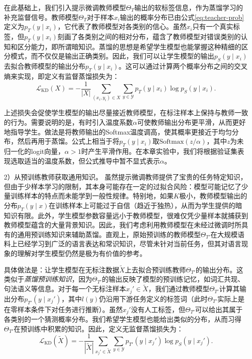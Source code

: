 \documentclass[../main.tex]{subfiles}
\begin{document}
在此基础上，我们引入提示微调教师模型$\Theta_T$输出的软标签信息，作为蒸馏学习的补充监督信号。教师模型$\Theta_T$对于样本$x_i$输出的概率分布已由公式\eqref{eq:teacher-prob}定义为$p_T(y\mid x_i)$，它代表了教师模型对各类别的信心。虽然$x_i$只有一个真实标签，但$p_T(y\mid x_i)$刻画了各类别之间的相对分布，蕴含了教师模型对错误类别的认知和区分能力，即所谓暗知识。蒸馏的思想是希望学生模型也能掌握这种精细的区分模式，而不仅仅是输出正确类别。因此，我们可以让学生模型的输出$p_S(y\mid x_i)$去拟合教师模型的输出分布$p_T(y\mid x_i)$。这可以通过计算两个概率分布之间的交叉熵来实现，即定义有监督蒸馏损失为：
\begin{equation}
	\label{eq:kd-loss-supervised}
	\mathcal{L}_{\text{KD}}(X) = -\frac{1}{|X|}\sum_{(x_i, y_i)\in X} \sum_{y \in \mathcal{Y}} p_T(y \mid x_i) \log p_S(y \mid x_i) .
\end{equation}

上述损失会促使学生模型的输出尽量接近教师模型，在标注样本上保持与教师一致的行为。需要说明的是，有时引入温度系数$\alpha$可使教师输出分布更平滑，从而更好地指导学生。做法是将教师输出的Softmax温度调高，使其概率更接近于均匀分布，然后再用于蒸馏。公式上相当于将$p_T(y\mid x_i)$取$\text{Softmax}(z/\alpha)$，其中$z$为未归一化的logit向量，$\alpha > 1$时产生平滑作用。在本章实验中，我们将根据验证集表现选取适当的温度系数，但公式推导中暂不显式表示$\alpha$。

2）从预训练教师获取通用知识。 虽然提示微调教师提供了宝贵的任务特定知识，但由于少样本学习的限制，其本身可能存在一定的过拟合风险：模型可能记忆了少量训练样本的特点而未能学到一般性规律。特别地，如果$K$极小，教师模型输出的分布$p_T(y\mid x)$在训练样本上可能过于自信（趋近于独热），从而为学生提供的暗知识有限。此外，学生模型参数容量远小于教师模型，很难仅凭少量样本就捕获到教师模型蕴含的大量背景知识。因此，我们考虑利用教师模型在未经过微调时所具有的通用预训练知识来辅助蒸馏。直观上，原始预训练的教师模型$\Theta_{T'}$在大规模语料上已经学习到广泛的语言表达和常识知识，尽管未针对当前任务，但其对语言现象的理解对学生模型仍然是极为有价值的参考。

具体做法是：让学生模型在无标注数据$\tilde{X}$上去拟合预训练教师$\Theta_{T'}$的输出分布。这类似于\emph{蒸馏预训练知识}，因为$\Theta_{T'}$的输出反映了模型的预训练记忆，如词汇共现、句法语义等信息。对于每一个无标注样本$x_j' \in \tilde{X}$，我们通过教师模型$\Theta_{T'}$计算其输出分布$p_{T'}(y\mid x_j')$，其中$l(y)$仍沿用下游任务定义的标签词（此时$\Theta_{T'}$实际上是在零样本条件下对任务进行推断）。虽然$x_j'$没有人工标签，但$\Theta_{T'}$可以给出其属于各类别的一个猜测概率分布。我们希望学生模型也能给出类似的分布，从而习得$\Theta_{T'}$在预训练中积累的知识。因此，定义无监督蒸馏损失为：
\begin{equation}
	\label{eq:kd-loss-unsupervised}
	\mathcal{L}_{\text{KD}}(\tilde{X}) = -\frac{1}{|\tilde{X}|}\sum_{x_j' \in \tilde{X}} \sum_{y \in \mathcal{Y}} p_{T'}(y \mid x_j') \log p_S(y \mid x_j') .
\end{equation}
\end{document}

